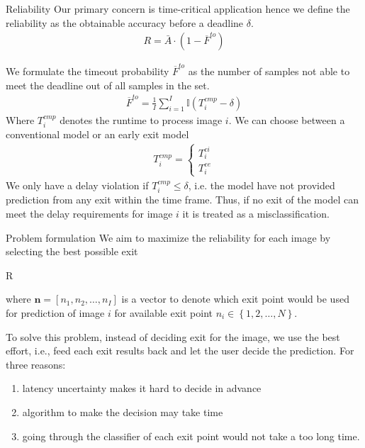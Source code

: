 \begin{enumdescript}
\begin{enumdescript}
	\end{enumdescript}
	
	\item[Reliability] Our primary concern is time-critical application hence we define the reliability as the obtainable accuracy before a deadline $ \delta $. 	
	\begin{align}
	R= \bar{A} \cdot (1-\overline{F}^{to})
	\end{align}
	
	We formulate the timeout probability $ \overline{F}^{to} $ as the number of samples not able to meet the deadline out of all samples in the set.
	\begin{align}
	\overline{F}^{to}=\frac{1}{I}\sum_{i=1}^{I} \mathbb{I}\left(T_{i}^{cmp}-\delta\right)
	\end{align}
	Where $ T_{i}^{cmp} $ denotes the runtime to process image $i$. We can choose between a conventional model or an early exit model 
	\begin{align}
	T^{cmp}_i = \begin{cases}
	T^{ci}_i \\
	T^{ee}_i
	\end{cases} \label{eq:t_ci-and-t_ee}
	\end{align}
	We only have a delay violation if $ T_i^{cmp} \leq \delta $, i.e. the model have not provided prediction from any exit within the time frame. Thus, if no exit of the model can meet the delay requirements for image $i$ it is treated as a misclassification. 
	
	\item[Problem formulation] We aim to maximize the reliability for each image by selecting the best possible exit
	\begin{maxi}
		{}{R}
		{}{}
	\end{maxi}
	where $ \bm{n} = \left[ n_1, n_2, \dots, n_I \right]$ is a vector to denote which exit point would be used for prediction of image $ i $ for available exit point $ n_i \in \left\{1,2, \dots, N\right\} $.
	
	To solve this problem, instead of deciding exit for the image, we use the best effort, i.e., feed each exit results back and let the user decide the prediction. For three reasons:
	\begin{enumerate}
		\item latency uncertainty makes it hard to decide in advance
		\item algorithm to make the decision may take time
		\item going through the classifier of each exit point would not take a too long time.
	\end{enumerate}
	
\end{enumdescript}

